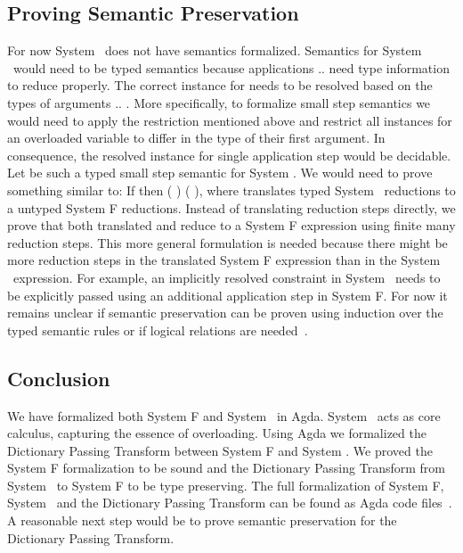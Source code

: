 \subsection{Proving Semantic Preservation }
For now System \Fo\ does not have semantics formalized.
Semantics for System \Fo\ would need to be typed semantics because applications     $..$   need type information to reduce properly.
The correct instance for  needs to be resolved based on the types of arguments  $..$ . 
More specifically, to formalize small step semantics we would need to apply the restriction mentioned above and restrict all instances for an overloaded variable  to differ in the type of their first argument. In consequence, the resolved instance for single application step     would be decidable.
Let    be such a typed small step semantic for System \Fo. We would need to prove something similar to: If    then  \Constr{[}  \Constr{]} (   )  (   ), where  translates typed System \Fo\ reductions to a untyped System F reductions.
Instead of translating reduction steps directly, we prove that both translated  and  reduce to a System F expression  using finite many reduction steps.
This more general formulation is needed because there might be more reduction steps in the translated System F expression than in the System \Fo\ expression. 
For example, an implicitly resolved constraint in System \Fo\ needs to be explicitly passed using an additional application step in System F. 
For now it remains unclear if semantic preservation can be proven using induction over the typed semantic rules or if logical relations are needed~\cite{logrel}.


\subsection{Conclusion}
We have formalized both System F and System \Fo\ in Agda. 
System \Fo\ acts as core calculus, capturing the essence of overloading.
Using Agda we formalized the Dictionary Passing Transform between System F and System \Fo. 
We proved the System F formalization to be sound and the Dictionary Passing Transform from System \Fo\ to System F to be type preserving. The full formalization of System F, System \Fo\ and the Dictionary Passing Transform can be found as Agda code files~\cite{code}.
A reasonable next step would be to prove semantic preservation for the Dictionary Passing Transform. 